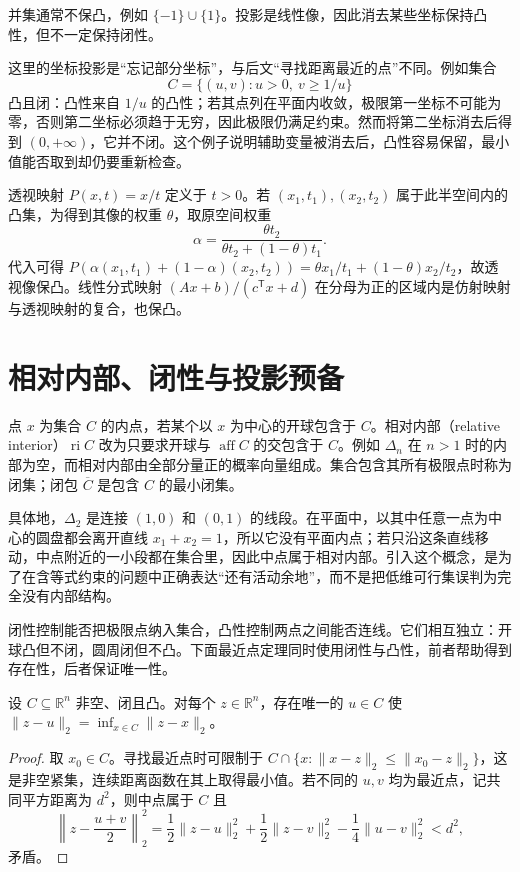 并集通常不保凸，例如 $\{-1\}\cup\{1\}$。投影是线性像，因此消去某些坐标保持凸性，但不一定保持闭性。

这里的坐标投影是“忘记部分坐标”，与后文“寻找距离最近的点”不同。例如集合
\[
 C=\{(u,v):u>0,\ v\geq1/u\}
\]
凸且闭：凸性来自 $1/u$ 的凸性；若其点列在平面内收敛，极限第一坐标不可能为零，否则第二坐标必须趋于无穷，因此极限仍满足约束。然而将第二坐标消去后得到 $(0,+\infty)$，它并不闭。这个例子说明辅助变量被消去后，凸性容易保留，最小值能否取到却仍要重新检查。

透视映射 $P(x,t)=x/t$ 定义于 $t>0$。若 $(x_1,t_1),(x_2,t_2)$ 属于此半空间内的凸集，为得到其像的权重 $\theta$，取原空间权重
\[
 \alpha=\frac{\theta t_2}{\theta t_2+(1-\theta)t_1}.
\]
代入可得 $P(\alpha(x_1,t_1)+(1-\alpha)(x_2,t_2))=\theta x_1/t_1+(1-\theta)x_2/t_2$，故透视像保凸。线性分式映射 $(Ax+b)/(c^{\mathsf T}x+d)$ 在分母为正的区域内是仿射映射与透视映射的复合，也保凸。

\section{相对内部、闭性与投影预备}

点 $x$ 为集合 $C$ 的内点，若某个以 $x$ 为中心的开球包含于 $C$。相对内部（relative interior）$\operatorname{ri}C$ 改为只要求开球与 $\operatorname{aff}C$ 的交包含于 $C$。例如 $\Delta_n$ 在 $n>1$ 时的内部为空，而相对内部由全部分量正的概率向量组成。集合包含其所有极限点时称为闭集；闭包 $\overline C$ 是包含 $C$ 的最小闭集。

具体地，$\Delta_2$ 是连接 $(1,0)$ 和 $(0,1)$ 的线段。在平面中，以其中任意一点为中心的圆盘都会离开直线 $x_1+x_2=1$，所以它没有平面内点；若只沿这条直线移动，中点附近的一小段都在集合里，因此中点属于相对内部。引入这个概念，是为了在含等式约束的问题中正确表达“还有活动余地”，而不是把低维可行集误判为完全没有内部结构。

闭性控制能否把极限点纳入集合，凸性控制两点之间能否连线。它们相互独立：开球凸但不闭，圆周闭但不凸。下面最近点定理同时使用闭性与凸性，前者帮助得到存在性，后者保证唯一性。

\begin{theorem}[最近点存在唯一性]
设 $C\subseteq\mathbb R^n$ 非空、闭且凸。对每个 $z\in\mathbb R^n$，存在唯一的 $u\in C$ 使 $\|z-u\|_2=\inf_{x\in C}\|z-x\|_2$。
\label{thm:co-projection-existence}
\end{theorem}
\begin{proof}
取 $x_0\in C$。寻找最近点时可限制于 $C\cap\{x:\|x-z\|_2\leq\|x_0-z\|_2\}$，这是非空紧集，连续距离函数在其上取得最小值。若不同的 $u,v$ 均为最近点，记共同平方距离为 $d^2$，则中点属于 $C$ 且
\[
 \left\|z-\frac{u+v}{2}\right\|_2^2
 =\frac12\|z-u\|_2^2+\frac12\|z-v\|_2^2-\frac14\|u-v\|_2^2<d^2,
\]
矛盾。
\end{proof}

